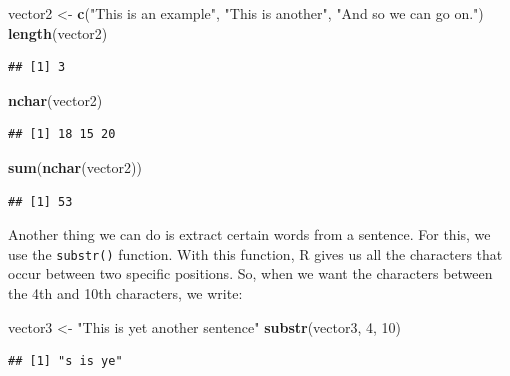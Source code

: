 \documentclass[
]{book}
\newenvironment{Shaded}{\begin{snugshade}}{\end{snugshade}}
\newcommand{\DecValTok}[1]{\textcolor[rgb]{0.00,0.00,0.81}{#1}}
\newcommand{\FunctionTok}[1]{\textcolor[rgb]{0.13,0.29,0.53}{\textbf{#1}}}
\newcommand{\NormalTok}[1]{#1}
\newcommand{\OtherTok}[1]{\textcolor[rgb]{0.56,0.35,0.01}{#1}}
\newcommand{\StringTok}[1]{\textcolor[rgb]{0.31,0.60,0.02}{#1}}
\begin{document}
\begin{Shaded}
\begin{Highlighting}[]
\NormalTok{vector2 }\OtherTok{\textless{}{-}} \FunctionTok{c}\NormalTok{(}\StringTok{"This is an example"}\NormalTok{, }\StringTok{"This is another"}\NormalTok{, }\StringTok{"And so we can go on."}\NormalTok{)}
\FunctionTok{length}\NormalTok{(vector2)}
\end{Highlighting}
\end{Shaded}

\begin{verbatim}
## [1] 3
\end{verbatim}

\begin{Shaded}
\begin{Highlighting}[]
\FunctionTok{nchar}\NormalTok{(vector2)}
\end{Highlighting}
\end{Shaded}

\begin{verbatim}
## [1] 18 15 20
\end{verbatim}

\begin{Shaded}
\begin{Highlighting}[]
\FunctionTok{sum}\NormalTok{(}\FunctionTok{nchar}\NormalTok{(vector2))}
\end{Highlighting}
\end{Shaded}

\begin{verbatim}
## [1] 53
\end{verbatim}

Another thing we can do is extract certain words from a sentence. For this, we use the \texttt{substr()} function. With this function, R gives us all the characters that occur between two specific positions. So, when we want the characters between the 4th and 10th characters, we write:

\begin{Shaded}
\begin{Highlighting}[]
\NormalTok{vector3 }\OtherTok{\textless{}{-}} \StringTok{"This is yet another sentence"}
\FunctionTok{substr}\NormalTok{(vector3, }\DecValTok{4}\NormalTok{, }\DecValTok{10}\NormalTok{)}
\end{Highlighting}
\end{Shaded}

\begin{verbatim}
## [1] "s is ye"
\end{verbatim}
\end{document}
